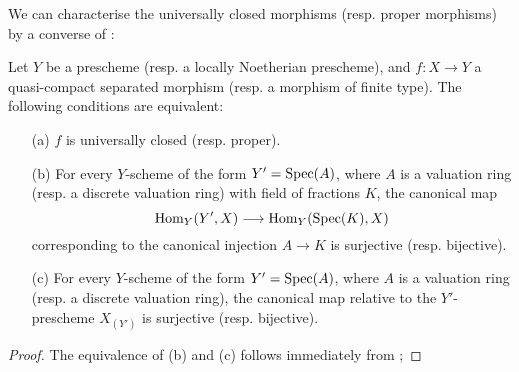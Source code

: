 We can characterise the universally closed morphisms (resp. proper morphisms) by a converse of :
\begin{theorem}[7.3.8]
\label{II.7.3.8}
Let $Y$ be a prescheme (resp. a locally Noetherian prescheme), and $f:X\to Y$ a quasi-compact separated morphism (resp. a morphism of finite type).
The following conditions are equivalent:
\begin{enumerate}
    \item[\rm{(a)}] $f$ is universally closed (resp. proper).
    \item[\rm{(b)}] For every $Y$-scheme of the form $Y'=\operatorname{Spec}(A)$, where $A$ is a valuation ring (resp. a discrete valuation ring) with field of fractions $K$, the canonical map
        \[
            \Hom_Y(Y',X) \to \Hom_Y(\Spec(K),X)
        \]
        corresponding to the canonical injection $A\to K$ is surjective (resp. bijective).
    \item[\rm{(c)}] For every $Y$-scheme of the form $Y'=\operatorname{Spec}(A)$, where $A$ is a valuation ring (resp. a discrete valuation ring), the canonical map  relative to the $Y'$-prescheme $X_{(Y')}$ is surjective (resp. bijective).
\end{enumerate}
\end{theorem}

\begin{proof}
\label{proof-II.7.3.8}
The equivalence of (b) and (c) follows immediately from ;
\end{proof}


